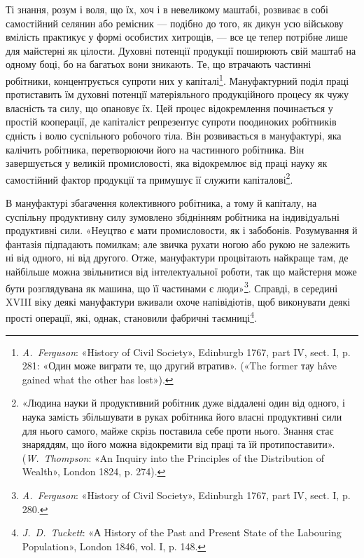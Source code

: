 Ті знання, розум і воля, що їх, хоч і в невеликому маштабі,
розвиває в собі самостійний селянин або ремісник — подібно до
того, як дикун усю військову вмілість практикує у формі особистих
хитрощів, — все це тепер потрібне лише для майстерні як цілости.
Духовні потенції продукції поширюють свій маштаб на одному
боці, бо на багатьох вони зникають. Те, що втрачають частинні
робітники, концентрується супроти них у капіталі\footnote{
\emph{A.~Ferguson}: «History of Civil Society», Edinburgb 1767,
part IV, sect. I, p. 281: «Один може виграти те, що другий втратив».
(«The former тау hâve gained what the other has lost»).
}. Мануфактурний
поділ праці протиставить їм духовні потенції матеріяльного
продукційного процесу як чужу власність та силу, що опановує
їх. Цей процес відокремлення починається у простій кооперації,
де капіталіст репрезентує супроти поодиноких робітників єдність
і волю суспільного робочого тіла. Він розвивається в мануфактурі,
яка калічить робітника, перетворюючи його на частинного
робітника. Він завершується у великій промисловості, яка відокремлює
від праці науку як самостійний фактор продукції та
примушує її служити капіталові\footnote{
«Людина науки й продуктивний робітник дуже віддалені один від
одного, і наука замість збільшувати в руках робітника його власні продуктивні
сили для нього самого, майже скрізь поставила себе проти нього.
Знання стає знаряддям, що його можна відокремити від праці та їй протипоставити».
(\emph{W.~Thompson}: «An Inquiry into the Principles of the
Distribution of Wealth», London 1824, p. 274).
}.

В мануфактурі збагачення колективного робітника, а тому
й капіталу, на суспільну продуктивну силу зумовлено збіднінням
робітника на індивідуальні продуктивні сили. «Неуцтво є
мати промисловости, як і забобонів. Розумування й фантазія
підпадають помилкам; але звичка рухати ногою або рукою не
залежить ні від одного, ні від другого. Отже, мануфактури процвітають
найкраще там, де найбільше можна звільнитися від
інтелектуальної роботи, так що майстерня може бути розглядувана
як машина, що її частинами є люди»\footnote{
\emph{A.~Ferguson}: «History of Civil Society», Edinburgh 1767,
part IV, sect. I, p. 280.
}. Справді, в середині
XVIII віку деякі мануфактури вживали охоче напівідіотів,
щоб виконувати деякі прості операції, які, однак, становили
фабричні таємниці\footnote{
\emph{J.~D.~Tuckett}: «А History of the Past and Present State of
the Labouring Population», London 1846, vol. I, p. 148.
}.

